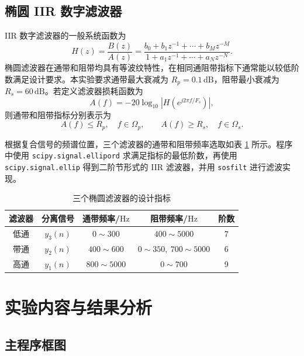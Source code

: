\documentclass[bachelor,ktreport,openany,oneside,AutoFakeBold=true]{buaathesis}
\newcommand{\Hz}{\mathrm{Hz}}
\begin{document}
\section{椭圆 IIR 数字滤波器}

IIR 数字滤波器的一般系统函数为
\begin{equation}
H(z)=\frac{B(z)}{A(z)}
=\frac{b_0+b_1z^{-1}+\cdots+b_Mz^{-M}}
{1+a_1z^{-1}+\cdots+a_Nz^{-N}}.
\end{equation}
椭圆滤波器在通带和阻带均具有等波纹特性，在相同通阻带指标下通常能以较低阶数满足设计要求。本实验要求通带最大衰减为 \(R_p=0.1\,\mathrm{dB}\)，阻带最小衰减为 \(R_s=60\,\mathrm{dB}\)。若定义滤波器损耗函数为
\begin{equation}
A(f)=-20\log_{10}\left|H\left(e^{j2\pi f/F_s}\right)\right|,
\end{equation}
则通带和阻带指标分别表示为
\begin{equation}
A(f)\le R_p,\quad f\in \Omega_p,
\qquad
A(f)\ge R_s,\quad f\in \Omega_s.
\end{equation}

根据复合信号的频谱位置，三个滤波器的通带和阻带频率选取如表 \ref{tab:filter-param} 所示。程序中使用 \texttt{scipy.signal.ellipord} 求满足指标的最低阶数，再使用 \texttt{scipy.signal.ellip} 得到二阶节形式的 IIR 滤波器，并用 \texttt{sosfilt} 进行滤波实现。

\begin{table}[H]
\centering
\caption{三个椭圆滤波器的设计指标}
\label{tab:filter-param}
\begin{tabular}{ccccc}
\toprule
滤波器 & 分离信号 & 通带频率/\(\Hz\) & 阻带频率/\(\Hz\) & 阶数\\
\midrule
低通 & \(y_3(n)\) & \(0\sim 300\) & \(400\sim 5000\) & 7\\
带通 & \(y_2(n)\) & \(400\sim 600\) & \(0\sim 350,\ 700\sim 5000\) & 6\\
高通 & \(y_1(n)\) & \(800\sim 5000\) & \(0\sim 700\) & 9\\
\bottomrule
\end{tabular}
\end{table}

\chapter{实验内容与结果分析}

\section{主程序框图}
\end{document}
